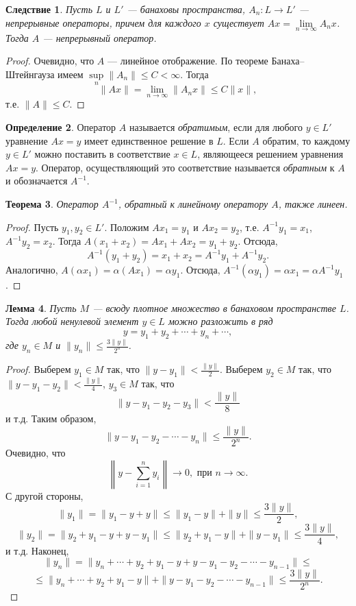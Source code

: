 \documentclass[12pt, titlepage, oneside]{amsbook}
\newtheorem{theorem}{Теорема}[chapter]
\newtheorem{lemma}[theorem]{Лемма}
\newtheorem{corollary}[theorem]{Следствие}
\theoremstyle{definition}
\newtheorem{definition}[theorem]{Определение}
\theoremstyle{remark}
\begin{document}
\begin{corollary}
\label{Ban-Sh2}
Пусть $L$ и $L'$ --- банаховы пространства, $A_n\colon L\rightarrow L'$ --- непрерывные операторы, причем для каждого $x$ существует $Ax=\lim\limits_{n\rightarrow\infty}A_n x$. Тогда $A$ --- непрерывный оператор.
\end{corollary}

\begin{proof}
Очевидно, что $A$ --- линейное отображение. По теореме Банаха--Штейнгауза имеем $\sup\limits_n\|A_n\|\leq C<\infty$. Тогда $$\|Ax\|=\lim\limits_{n\rightarrow\infty}\|A_n x\|\leq C\|x\|,$$ т.е. $\|A\|\leq C$.
\end{proof}

 \begin{definition}
Оператор $A$ называется \emph{обратимым}, если для любого $y\in L'$ уравнение $Ax=y$ имеет единственное решение в $L$. Если $A$ обратим, то каждому $y\in L'$ можно поставить в соответствие $x\in L$, являющееся решением уравнения $Ax=y$. Оператор, осуществляющий это соответствие называется \emph{обратным} к $A$ и обозначается $A^{-1}$.
\end{definition}


\begin{theorem}
\label{Op3}
Оператор $A^{-1}$, обратный к линейному оператору $A$, также линеен.
\end{theorem}

\begin{proof}
Пусть $y_1,y_2\in L'$. Положим $Ax_1=y_1$ и $Ax_2=y_2$, т.е. $A^{-1}y_1=x_1$, $A^{-1}y_2=x_2$. Тогда $A(x_1+x_2)=Ax_1+Ax_2=y_1+y_2$. Отсюда, $$A^{-1}(y_1+y_2)=x_1+x_2=A^{-1}y_1+A^{-1}y_2.$$ Аналогично, $A(\alpha x_1)=\alpha(Ax_1)=\alpha y_1$. Отсюда, $A^{-1}(\alpha y_1)=\alpha x_1=\alpha A^{-1}y_1$.
\end{proof}

\begin{lemma}
\label{Op4} Пусть $M$ --- всюду плотное множество в банаховом пространстве $L$. Тогда любой ненулевой элемент $y\in L$ можно разложить в ряд $$y=y_1+y_2+\cdots+y_n+\cdots,$$ где $y_n\in M$ и $\|y_n\|\leq\frac{3\|y\|}{2^n}$.
\end{lemma}

\begin{proof}
Выберем $y_1\in M$ так, что $\|y-y_1\|<\frac{\|y\|}{2}$. Выберем $y_2\in M$ так, что $\|y-y_1-y_2\|<\frac{\|y\|}{4}$, $y_3\in M$ так, что $$\|y-y_1-y_2-y_3\|<\frac{\|y\|}{8}$$ и т.д. Таким образом, $$\|y-y_1-y_2-\cdots-y_n\|\leq\frac{\|y\|}{2^n}.$$ Очевидно, что $$\left\|y-\sum\limits_{i=1}^n y_i\right\|\rightarrow 0,\text{ при } n\rightarrow\infty.$$ С другой стороны, $$\|y_1\|=\|y_1-y+y\|\leq\|y_1-y\|+\|y\|\leq\frac{3\|y\|}{2},$$
$$\|y_2\|=\|y_2+y_1-y+y-y_1\|\leq\|y_2+y_1-y\|+\|y-y_1\|\leq\frac{3\|y\|}{4},$$ и т.д. Наконец, $$\|y_n\|=\|y_n+\cdots+y_2+y_1-y+y-y_1-y_2-\cdots-y_{n-1}\|\leq$$ $$\leq\|y_n+\cdots+y_2+y_1-y\|+\|y-y_1-y_2-\cdots-y_{n-1}\|\leq\frac{3\|y\|}{2^n}.$$
\end{proof}
\end{document}

